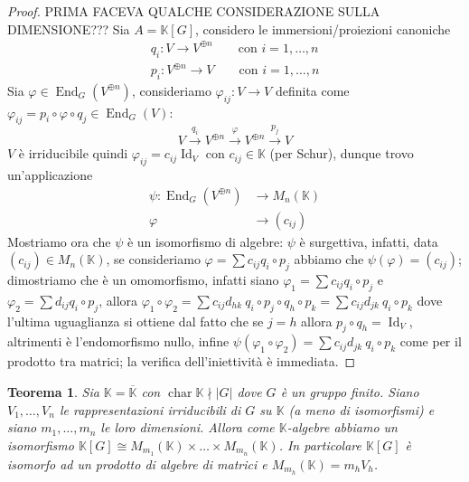 \documentclass[11pt]{article}
\theoremstyle{plain}
\newtheorem{thm}{Teorema}[section]
\theoremstyle{definition}
\theoremstyle{remark}
\newcommand{\K}{\mathbb{K}}
\DeclareMathOperator{\End}{End}
\DeclareMathOperator{\Id}{Id}
\DeclareMathOperator{\Char}{char}
\begin{document}
\begin{proof}

PRIMA FACEVA QUALCHE CONSIDERAZIONE SULLA DIMENSIONE???
	Sia $A=\K[G]$, considero le immersioni/proiezioni canoniche
	\begin{align*}
		q_i:V\to V^{\oplus n}\qquad \text{con }i=1,\ldots,n\\
		p_i:V^{\oplus n}\to V\qquad \text{con }i=1,\ldots,n
	\end{align*}
	Sia $\varphi\in \End_G(V^{\oplus n})$, consideriamo $\varphi_{ij}:V\to V$ definita come $\varphi_{ij} = p_i\circ\varphi\circ q_j\in\End_G(V)$:
	\[
		V \xrightarrow{q_i} V^{\oplus n} \xrightarrow{\varphi} V^{\oplus n} \xrightarrow{p_j} V
	\]
	$V$ è irriducibile quindi $\varphi_{ij} = c_{ij}\Id_V$ con $c_{ij}\in \K$ (per Schur), dunque trovo un'applicazione
	\begin{align*}
		\psi:\End_G(V^{\oplus n})&\to M_n(\K)\\
		\varphi&\to (c_{ij})
	\end{align*}
	Mostriamo ora che $\psi$ è un isomorfismo di algebre: $\psi$ è surgettiva, infatti, data $(c_{ij})\in M_n(\K)$, se consideriamo $\varphi = \sum c_{ij} q_i\circ p_j$ abbiamo che $\psi(\varphi) = (c_{ij})$; dimostriamo che è un omomorfismo, infatti siano $\varphi_1 = \sum c_{ij} q_i\circ p_j$ e $\varphi_2 = \sum d_{ij} q_i\circ p_j$, allora $\varphi_1\circ\varphi_2 = \sum c_{ij} d_{hk}\ q_i\circ p_j\circ q_h\circ p_k = \sum c_{ij}d_{jk}\ q_i\circ p_k$ dove l'ultima uguaglianza si ottiene dal fatto che se $j=h$ allora $p_j\circ q_h=\Id_V$, altrimenti è l'endomorfismo nullo, infine $\psi(\varphi_1\circ \varphi_2) = \sum c_{ij}d_{jk}\  q_i\circ p_k$ come per il prodotto tra matrici; la verifica dell'iniettività è immediata.
\end{proof}

\begin{thm}
	Sia $\K=\overline{\K}$ con $\Char \K \nmid |G|$ dove $G$ è un gruppo finito. Siano $V_1,\ldots,V_n$ le rappresentazioni irriducibili di $G$ su $\K$ (a meno di isomorfismi) e siano $m_1,\ldots,m_n$ le loro dimensioni. Allora come $\K$-algebre abbiamo un isomorfismo $\K[G] \cong M_{m_1}(\K)\times\ldots\times M_{m_n}(\K)$. In particolare $\K[G]$ è isomorfo ad un prodotto di algebre di matrici e $M_{m_h}(\K) = m_hV_h$.
\end{thm}
\end{document}
